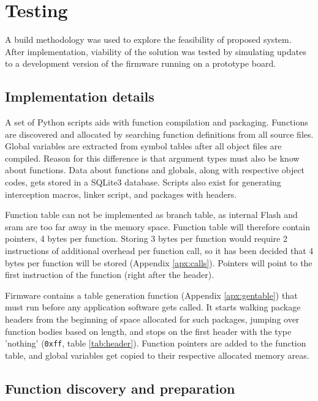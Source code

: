 \newpage
\section{Testing}

A build methodology was used to explore the feasibility of proposed system. After implementation, viability of the solution was tested by simulating updates to a development version of the firmware running on a prototype board.

\subsection{Implementation details}

A set of Python scripts aids with function compilation and packaging. Functions are discovered and allocated by searching function definitions from all source files. Global variables are extracted from symbol tables after all object files are compiled. Reason for this difference is that argument types must also be know about functions. Data about functions and globals, along with respective object codes, gets stored in a SQLite3 database. Scripts also exist for generating interception macros, linker script, and packages with headers.

Function table can not be implemented as branch table, as internal Flash and \gls{sram} are too far away in the memory space. Function table will therefore contain pointers, 4 bytes per function. Storing 3 bytes per function would require 2 instructions of additional overhead per function call, so it has been decided that 4 bytes per function will be stored (Appendix \ref{apx:calls}). Pointers will point to the first instruction of the function (right after the header).

Firmware contains a table generation function (Appendix \ref{apx:gentable}) that must run before any application software gets called. It starts walking package headers from the beginning of space allocated for such packages, jumping over function bodies based on length, and stops on the first header with the type 'nothing' (\texttt{0xff}, table \ref{tab:header}). Function pointers are added to the function table, and global variables get copied to their respective allocated memory areas.

\subsection{Function discovery and preparation}

